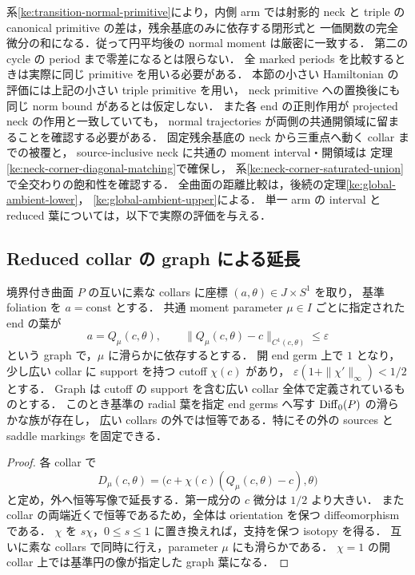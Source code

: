 系\ref{ke:transition-normal-primitive}により，内側 arm では射影的 neck と
triple の canonical primitive の差は，残余基底のみに依存する閉形式と
一価関数の完全微分の和になる．従って円平均後の normal moment は厳密に一致する．
第二の cycle の period まで零差になるとは限らない．
全 marked periods を比較するときは実際に同じ primitive を用いる必要がある．
本節の小さい Hamiltonian の評価には上記の小さい triple primitive を用い，
neck primitive への置換後にも同じ norm bound があるとは仮定しない．
また各 end の正則作用が projected neck の作用と一致していても，
normal trajectories が両側の共通開領域に留まることを確認する必要がある．
固定残余基底の neck から三重点へ動く collar までの被覆と，
source-inclusive neck に共通の moment interval・開領域は
定理\ref{ke:neck-corner-diagonal-matching}で確保し，
系\ref{ke:neck-corner-saturated-union}で全交わりの飽和性を確認する．
全曲面の距離比較は，後続の定理\ref{ke:global-ambient-lower}，
\ref{ke:global-ambient-upper}による．
単一 arm の interval と reduced 葉については，以下で実際の評価を与える．

\subsection{Reduced collar の graph による延長}

\begin{lemma}
\label{ke:reduced-collar-graph}
境界付き曲面 $P$ の互いに素な collars に座標 $(a,\theta)\in J\times S^1$ を取り，
基準 foliation を $a=\mathrm{const}$ とする．
共通 moment parameter $\mu\in I$ ごとに指定された end の葉が
\[
 a=Q_\mu(c,\theta),\qquad
 \|Q_\mu(c,\theta)-c\|_{C^1(c,\theta)}\le\varepsilon
\]
という graph で，$\mu$ に滑らかに依存するとする．
開 end germ 上で $1$ となり，少し広い collar に support を持つ cutoff $\chi(c)$ があり，
$\varepsilon(1+\|\chi'\|_\infty)<1/2$ とする．
Graph は cutoff の support を含む広い collar 全体で定義されているものとする．
このとき基準の radial 葉を指定 end germs へ写す $\operatorname{Diff}_0(P)$ の滑らかな族が存在し，
広い collars の外では恒等である．特にその外の sources と saddle markings を固定できる．
\end{lemma}
\begin{proof}
各 collar で
\[
 D_\mu(c,\theta)
 =\bigl(c+\chi(c)(Q_\mu(c,\theta)-c),\theta\bigr)
\]
と定め，外へ恒等写像で延長する．第一成分の $c$ 微分は $1/2$ より大きい．
また collar の両端近くで恒等であるため，全体は orientation を保つ diffeomorphism である．
$\chi$ を $s\chi$，$0\le s\le1$ に置き換えれば，支持を保つ isotopy を得る．
互いに素な collars で同時に行え，parameter $\mu$ にも滑らかである．
$\chi=1$ の開 collar 上では基準円の像が指定した graph 葉になる．
\end{proof}

